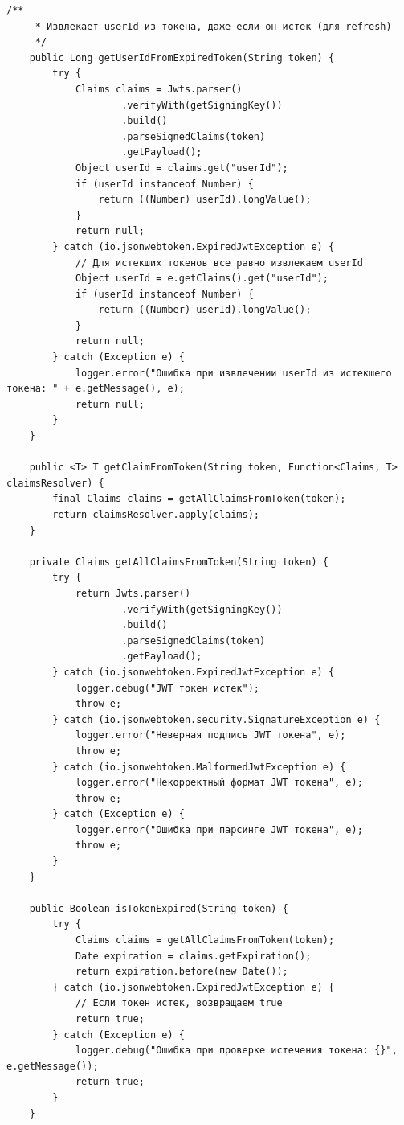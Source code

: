 \begin{lstlisting}[basicstyle=\tiny\ttfamily,breaklines=true]
    /**
     * Извлекает userId из токена, даже если он истек (для refresh)
     */
    public Long getUserIdFromExpiredToken(String token) {
        try {
            Claims claims = Jwts.parser()
                    .verifyWith(getSigningKey())
                    .build()
                    .parseSignedClaims(token)
                    .getPayload();
            Object userId = claims.get("userId");
            if (userId instanceof Number) {
                return ((Number) userId).longValue();
            }
            return null;
        } catch (io.jsonwebtoken.ExpiredJwtException e) {
            // Для истекших токенов все равно извлекаем userId
            Object userId = e.getClaims().get("userId");
            if (userId instanceof Number) {
                return ((Number) userId).longValue();
            }
            return null;
        } catch (Exception e) {
            logger.error("Ошибка при извлечении userId из истекшего токена: " + e.getMessage(), e);
            return null;
        }
    }

    public <T> T getClaimFromToken(String token, Function<Claims, T> claimsResolver) {
        final Claims claims = getAllClaimsFromToken(token);
        return claimsResolver.apply(claims);
    }

    private Claims getAllClaimsFromToken(String token) {
        try {
            return Jwts.parser()
                    .verifyWith(getSigningKey())
                    .build()
                    .parseSignedClaims(token)
                    .getPayload();
        } catch (io.jsonwebtoken.ExpiredJwtException e) {
            logger.debug("JWT токен истек");
            throw e;
        } catch (io.jsonwebtoken.security.SignatureException e) {
            logger.error("Неверная подпись JWT токена", e);
            throw e;
        } catch (io.jsonwebtoken.MalformedJwtException e) {
            logger.error("Некорректный формат JWT токена", e);
            throw e;
        } catch (Exception e) {
            logger.error("Ошибка при парсинге JWT токена", e);
            throw e;
        }
    }

    public Boolean isTokenExpired(String token) {
        try {
            Claims claims = getAllClaimsFromToken(token);
            Date expiration = claims.getExpiration();
            return expiration.before(new Date());
        } catch (io.jsonwebtoken.ExpiredJwtException e) {
            // Если токен истек, возвращаем true
            return true;
        } catch (Exception e) {
            logger.debug("Ошибка при проверке истечения токена: {}", e.getMessage());
            return true;
        }
    }


\end{lstlisting}
